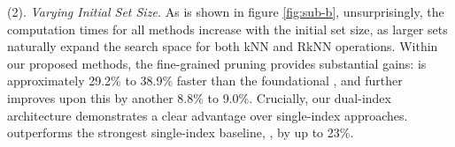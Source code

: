 \noindent(2). \textit{Varying Initial Set Size.} As is shown in figure \ref{fig:sub-b}, unsurprisingly, the computation times for all methods increase with the initial set size, as larger sets naturally expand the search space for both kNN and RkNN operations. Within our proposed methods, the fine-grained pruning provides substantial gains: \dualtreefast is approximately 29.2\% to 38.9\% faster than the foundational \dualtree, and \dualtreeopt further improves upon this by another 8.8\% to 9.0\%. Crucially, our dual-index architecture demonstrates a clear advantage over single-index approaches. \dualtree outperforms the strongest single-index baseline, \deltatree, by up to 23\%. 




